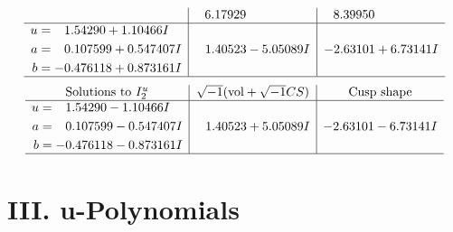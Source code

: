 \documentclass[1p]{elsarticle_modified}
\theoremstyle{definition}
\newcommand{\I}{\sqrt{-1}}
\begin{document}
$$\begin{array}{c|c|c}
 & \phantom{-}6.17929\phantom{ +0.000000I} & \phantom{-}8.39950\phantom{ +0.000000I} \\ \hline\begin{aligned}
u &= \phantom{-}1.54290 + 1.10466 I \\
a &= \phantom{-}0.107599 + 0.547407 I \\
b &= -0.476118 + 0.873161 I\end{aligned}
 & \phantom{-}1.40523 - 5.05089 I & -2.63101 + 6.73141 I\\
 \hline 
 \end{array}$$\newpage$$\begin{array}{c|c|c}  
\text{Solutions to }I^u_{2}& \I (\text{vol} + \sqrt{-1}CS) & \text{Cusp shape}\\
 \hline 
\begin{aligned}
u &= \phantom{-}1.54290 - 1.10466 I \\
a &= \phantom{-}0.107599 - 0.547407 I \\
b &= -0.476118 - 0.873161 I\end{aligned}
 & \phantom{-}1.40523 + 5.05089 I & -2.63101 - 6.73141 I\\
 \hline 
 \end{array}$$\newpage
\newpage\renewcommand{\arraystretch}{1}
\centering \section*{ III. u-Polynomials}
\end{document}
